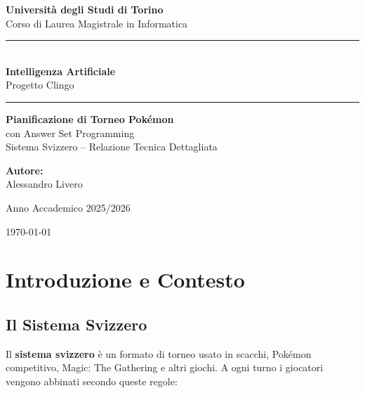 \documentclass[12pt,a4paper]{article}
\newcommand{\HRule}{\rule{\linewidth}{0.5mm}}
\begin{document}
\raggedbottom

\begin{titlepage}
  \centering
  \vspace*{2cm}

  {\Large\textbf{Universit\`a degli Studi di Torino}\\[0.3em]
  Corso di Laurea Magistrale in Informatica}

  \vspace{1cm}
  \HRule\\[0.4em]
  {\LARGE\textbf{Intelligenza Artificiale}}\\[0.3em]
  {\large Progetto Clingo}\\[0.2em]
  \HRule

  \vspace{1.8cm}
  {\huge\textbf{Pianificazione di Torneo Pok\'emon}}\\[0.6em]
  {\Large con Answer Set Programming}\\[0.4em]
  {\large Sistema Svizzero -- Relazione Tecnica Dettagliata}

  \vspace{3cm}
  {\large\textbf{Autore:}}\\[0.5em]
  {\large Alessandro Livero}

  \vspace{1.5cm}
  {\large Anno Accademico 2025/2026}

  \vfill
  {\large \today}
\end{titlepage}

\tableofcontents
\newpage

\section{Introduzione e Contesto}

\subsection{Il Sistema Svizzero}

Il \textbf{sistema svizzero} è un formato di torneo usato in scacchi, Pokémon
competitivo, Magic: The Gathering e altri giochi. A ogni turno i giocatori
vengono abbinati secondo queste regole:
\end{document}
